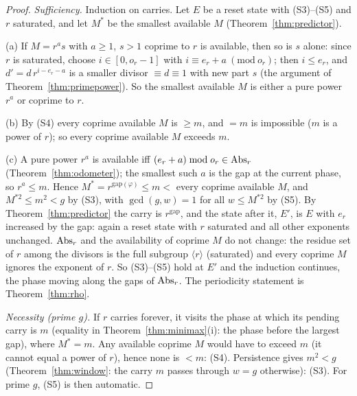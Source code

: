 \begin{proof}
\emph{Sufficiency.} Induction on carries. Let \(E\) be a reset state with (S3)--(S5) and \(r\) saturated, and let \(M^\ast\) be the smallest available \(M\) (Theorem~\ref{thm:predictor}).

(a) If \(M=r^as\) with \(a\ge1\), \(s>1\) coprime to \(r\) is available, then so is \(s\) alone: since \(r\) is saturated, choose \(i\in[0,o_r-1]\) with \(i\equiv e_r+a\ (\mathrm{mod}\ o_r)\); then \(i\le e_r\), and \(d'=d\,r^{i-e_r-a}\) is a smaller divisor \(\equiv d\equiv1\) with new part \(s\) (the argument of Theorem~\ref{thm:primepower}). So the smallest available \(M\) is either a pure power \(r^a\) or coprime to \(r\).

(b) By (S4) every coprime available \(M\) is \(\ge m\), and \(=m\) is impossible (\(m\) is a power of \(r\)); so every coprime available \(M\) exceeds \(m\).

(c) A pure power \(r^a\) is available iff \((e_r+a)\bmod o_r\in\operatorname{Abs}_r\) (Theorem~\ref{thm:odometer}); the smallest such \(a\) is the gap at the current phase, so \(r^a\le m\). Hence \(M^\ast=r^{\mathrm{gap}(\varphi)}\le m<\) every coprime available \(M\), and \(M^{\ast2}\le m^2<g\) by (S3), with \(\gcd(g,w)=1\) for all \(w\le M^{\ast2}\) by (S5). By Theorem~\ref{thm:predictor} the carry is \(r^{\mathrm{gap}}\), and the state after it, \(E'\), is \(E\) with \(e_r\) increased by the gap: again a reset state with \(r\) saturated and all other exponents unchanged. \(\operatorname{Abs}_r\) and the availability of coprime \(M\) do not change: the residue set of \(r\) among the divisors is the full subgroup \(\langle r\rangle\) (saturated) and every coprime \(M\) ignores the exponent of \(r\). So (S3)--(S5) hold at \(E'\) and the induction continues, the phase moving along the gaps of \(\operatorname{Abs}_r\). The periodicity statement is Theorem~\ref{thm:rho}.

\emph{Necessity (prime \(g\)).} If \(r\) carries forever, it visits the phase at which its pending carry is \(m\) (equality in Theorem~\ref{thm:minimax}(i): the phase before the largest gap), where \(M^\ast=m\). Any available coprime \(M\) would have to exceed \(m\) (it cannot equal a power of \(r\)), hence none is \(<m\): (S4). Persistence gives \(m^2<g\) (Theorem~\ref{thm:window}: the carry \(m\) passes through \(w=g\) otherwise): (S3). For prime \(g\), (S5) is then automatic.
\end{proof}

